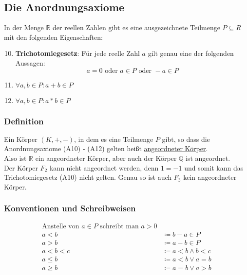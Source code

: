\documentclass{article}
\begin{document}
\subsection{Die Anordnungsaxiome}

In der Menge $\mathbb{R}$ der reellen Zahlen gibt es eine ausgezeichnete Teilmenge $P \subseteq R$ mit den folgenden
Eigenschaften:

\begin{enumerate}[label=(A\arabic*)]
\setcounter{enumi}{9}
\item \label{axiom:10} \textbf{Trichotomiegesetz}: Für jede reelle Zahl $a$ gilt genau eine der folgenden Aussagen:
  \[
    a = 0 \text{ oder } a \in P \text{ oder } -a \in P
  \]
\item \label{axiom:11} $\forall a,b \in P \colon a + b \in P$
\item \label{axiom:12} $\forall a,b \in P \colon a * b \in P$
\end{enumerate}

\subsubsection{Definition}

Ein Körper $(K, +, -)$, in dem es eine Teilmenge $P$ gibt, so dass die Anordnungsaxiome (A10) - (A12) gelten
heißt \underline{angeordneter Körper}. \\

Also ist $\mathbb{R}$ ein angeordneter Körper, aber auch der Körper $\mathbb{Q}$ ist angeordnet. \\

Der Körper $F_2$ kann nicht angeordnet werden, denn $1 = -1$ und somit kann das Trichotomiegesetz (A10) nicht
gelten. Genau so ist auch $F_3$ kein angeordneter Körper.

\subsubsection{Konventionen und Schreibweisen}

\begin{align*}
  \text{Anstelle von $a \in P$ schreibt man $a > 0$} \\
  a < b &\coloneqq b - a \in P \\
  a > b &\coloneqq a - b \in P \\
  a < b < c &\coloneqq a < b \land b < c \\
  a \leq b &\coloneqq a < b \lor a = b \\
  a \geq b &\coloneqq a = b \lor a > b \\
\end{align*}
\end{document}
